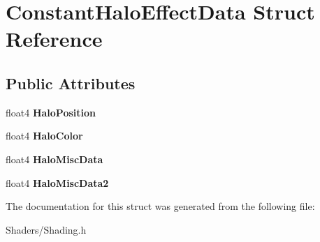 \hypertarget{structConstantHaloEffectData}{}\section{Constant\+Halo\+Effect\+Data Struct Reference}
\label{structConstantHaloEffectData}
\subsection*{Public Attributes}
\begin{DoxyCompactItemize}
\item 
\mbox{\label{structConstantHaloEffectData_a54b15ba145326eeb73aff33405f9ad15}} 
float4 {\bfseries Halo\+Position}
\item 
\mbox{\label{structConstantHaloEffectData_aa8681074688bc02daf1ffa1e6c5ccfb1}} 
float4 {\bfseries Halo\+Color}
\item 
\mbox{\label{structConstantHaloEffectData_a3923463615dc35df5f3ab39f32da70e7}} 
float4 {\bfseries Halo\+Misc\+Data}
\item 
\mbox{\label{structConstantHaloEffectData_ad21e611ff6b297ca7391477e3148ec5d}} 
float4 {\bfseries Halo\+Misc\+Data2}
\end{DoxyCompactItemize}


The documentation for this struct was generated from the following file\+:\begin{DoxyCompactItemize}
\item 
Shaders/Shading.\+h\end{DoxyCompactItemize}
